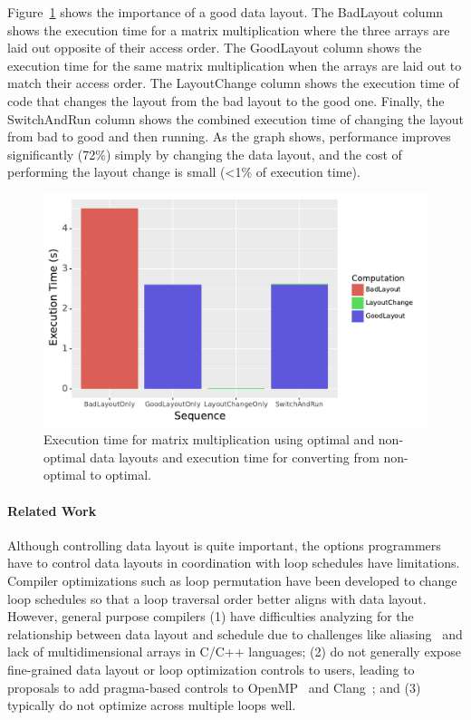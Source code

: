 \documentclass{article}
\begin{document}
Figure~\ref{DataLayoutImportance} shows the importance of a good data layout. 
The BadLayout column shows the execution time for a matrix multiplication where the three arrays are laid out opposite of their access order. 
The GoodLayout column shows the execution time for the same matrix multiplication when the arrays are laid out to match their access order.
The LayoutChange column shows the execution time of code that changes the layout from the bad layout to the good one.
Finally, the SwitchAndRun column shows the combined execution time of changing the layout from bad to good and then running.
As the graph shows, performance improves  significantly (72\%) simply by changing the data layout, and the cost of performing the layout change is small (<1\% of execution time). 


\begin{figure}
	\includegraphics[width=\columnwidth]{IntroExampleGraph.pdf}
	\caption{Execution time for matrix multiplication using optimal and non-optimal data layouts and execution time for converting from non-optimal to optimal.}
	\label{DataLayoutImportance}
\end{figure}

\paragraph{Related Work}
Although controlling data layout is quite important, the options programmers have to control
data layouts in coordination with loop schedules have limitations.
Compiler optimizations such as loop permutation have been developed to change loop
schedules so that a loop traversal order better aligns with data layout.
However, general purpose compilers 
(1) have difficulties analyzing for the relationship between
data layout and schedule due to challenges like aliasing~\cite{hind2001pointer} and lack of multidimensional arrays in 
C/C++ languages; 
(2) do not generally expose fine-grained data layout or loop optimization
controls to users, leading to proposals to add pragma-based controls to OpenMP~\cite{kruse2019design} and Clang~\cite{kruse2018user}; and 
(3) typically do not optimize across multiple loops well.
\end{document}
